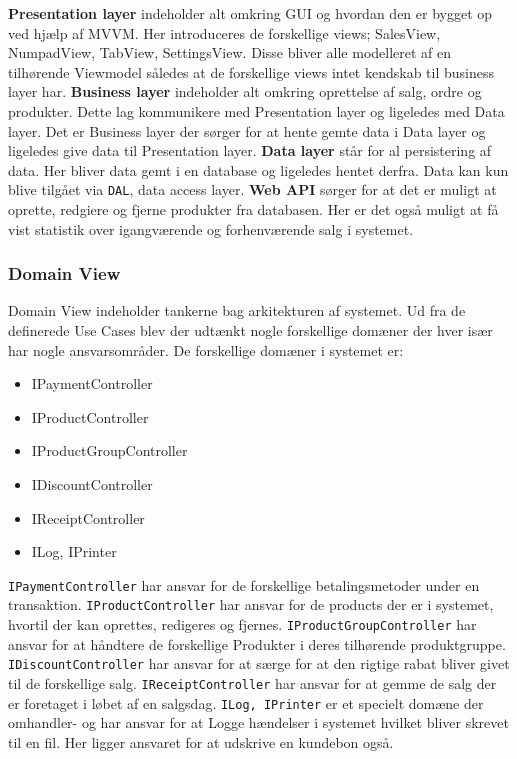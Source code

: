 \textbf{Presentation layer} indeholder alt omkring GUI og hvordan den er bygget op ved hjælp af MVVM. Her introduceres de forskellige views; SalesView, NumpadView, TabView, SettingsView. Disse bliver alle modelleret af en tilhørende Viewmodel således at de forskellige views intet kendskab til business layer har. \textbf{Business layer} indeholder alt omkring oprettelse af salg, ordre og produkter. Dette lag kommunikere med Presentation layer og ligeledes med Data layer. Det er Business layer der sørger for at hente gemte data i Data layer og ligeledes give data til Presentation layer.\newline
\textbf{Data layer} står for al persistering af data. Her bliver data gemt i en database og ligeledes hentet derfra. Data kan kun blive tilgået via \texttt{DAL}, data access layer.\newline
\textbf{Web API} sørger for at det er muligt at oprette, redgiere og fjerne produkter fra databasen. Her er det også muligt at få vist statistik over igangværende og forhenværende salg i systemet. 

\subsubsection{Domain View}
Domain View indeholder tankerne bag arkitekturen af systemet. Ud fra de definerede Use Cases blev der udtænkt nogle forskellige domæner der hver især har nogle ansvarsområder.\newline
De forskellige domæner i systemet er:\newline
\begin{itemize}
	\item IPaymentController
	\item IProductController
	\item IProductGroupController
	\item IDiscountController
	\item IReceiptController
	\item ILog, IPrinter
\end{itemize}	

\texttt{IPaymentController} har ansvar for de forskellige betalingsmetoder under en transaktion. \texttt{IProductController} har ansvar for de products der er i systemet, hvortil der kan oprettes, redigeres og fjernes. 
\texttt{IProductGroupController} har ansvar for at håndtere de forskellige Produkter i deres tilhørende produktgruppe.
\texttt{IDiscountController} har ansvar for at særge for at den rigtige rabat bliver givet til de forskellige salg.
\texttt{IReceiptController} har ansvar for at gemme de salg der er foretaget i løbet af en salgsdag.
\texttt{ILog, IPrinter} er et specielt domæne der omhandler- og har ansvar for at Logge hændelser i systemet hvilket bliver skrevet til en fil. Her ligger ansvaret for at udskrive en kundebon også.


